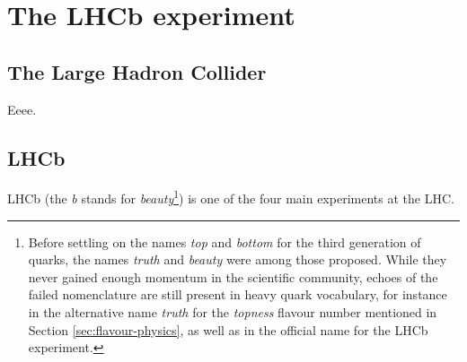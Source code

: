 \chapter{The LHCb experiment}

\section{The Large Hadron Collider}
Eeee.

\section{LHCb}
LHCb (the \textit{b} stands for \textit{beauty}\footnote{Before settling on the names \textit{top} and \textit{bottom} for the third generation of quarks, the names \textit{truth} and \textit{beauty} were among those proposed. While they never gained enough momentum in the scientific community, echoes of the failed nomenclature are still present in heavy quark vocabulary, for instance in the alternative name \textit{truth} for the \textit{topness} flavour number mentioned in Section \ref{sec:flavour-physics}, as well as in the official name for the LHCb experiment.}) is one of the four main experiments at the LHC.
